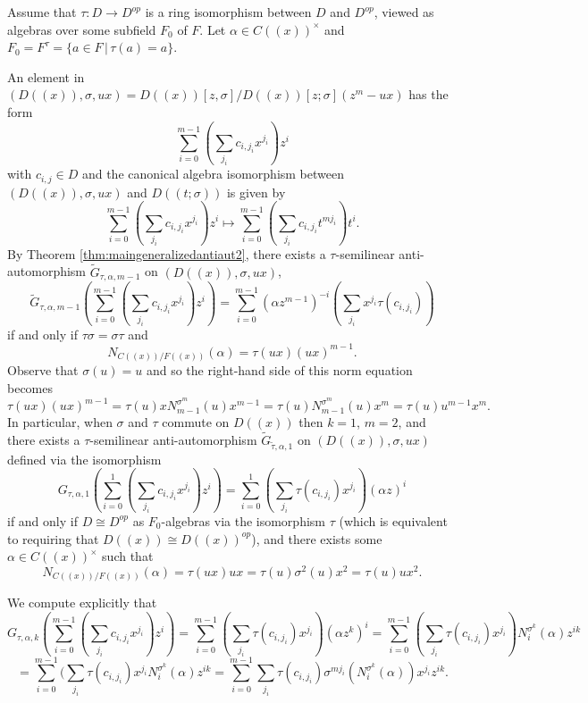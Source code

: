\documentclass{amsart}
\theoremstyle{plain}
\theoremstyle{definition}
\numberwithin{equation}{section}
\numberwithin{figure}{section}
\begin{document}
Assume that $\tau:D\to D^{op}$ is a ring isomorphism between $D$ and $D^{op}$, viewed as algebras over some subfield $F_0$ of $F$. Let  $\alpha\in C((x))^\times$ and $F_0=F^\tau=\{a\in F\,|\,\tau(a)=a \}$.

An element in $(D((x)),\sigma, ux)=D((x))[z,\sigma]/D((x))[z;\sigma](z^m-ux)$ has the form
 $$ \sum_{i=0}^{m-1}(\sum_{j_i}c_{i,j_i} x^{j_i}) z^i$$
 with $c_{i,j}\in D$ and the canonical algebra isomorphism between $(D((x)),\sigma, ux)$ and $D((t;\sigma))$ is given by
 $$ \sum_{i=0}^{m-1}(\sum_{j_i}c_{i,j_i} x^{j_i}) z^i\mapsto  \sum_{i=0}^{m-1}(\sum_{j_i}c_{i,j_i} t^{mj_i}) t^i.$$
By Theorem   \ref{thm:maingeneralizedantiaut2}, there exists a $\tau$-semilinear anti-automorphism $\widetilde G_{\tau,\alpha,m-1}$ on $ (D((x)),\sigma,ux)$,
 $$\widetilde G_{\tau,\alpha,m-1} ( \sum_{i=0}^{m-1}(\sum_{j_i}c_{i,{j_i}} x^{j_i}) z^i ) =
\sum_{i=0}^{m-1}  (\alpha z^{m-1})^{-i}(\sum_{j_i} x^{j_i} \tau(c_{i,{j_i}}))$$
  if and only if  $\tau\sigma=\sigma\tau$ and
 $$N_{C((x))/F((x))}(\alpha)=\tau(ux)(ux)^{m-1}.$$
 Observe that
 $\sigma(u) = u$ and so the right-hand side of this norm equation becomes
 $$\tau(ux)(ux)^{m-1}=\tau(u)x N_{m-1}^{\sigma^m}(u)x^{m-1}=\tau(u) N_{m-1}^{\sigma^m}(u) x^m=\tau(u) u^{m-1} x^m.$$
 In particular, when $\sigma$ and $\tau$ commute on $D((x))$ then $k=1$, $m=2$, and there exists a $\tau$-semilinear anti-automorphism $\widetilde G_{\tilde\tau,\alpha,1}$ on $(D((x)),\sigma, ux)$ defined via the isomorphism
$$G_{\tau,\alpha,1} ( \sum_{i=0}^{1}(\sum_{j_i}c_{i,{j_i}} x^{j_i}) z^i ) =
\sum_{i=0}^{1}(\sum_{j_i}\tau(c_{i,{j_i}}) x^{j_i}) (\alpha z)^i$$
 if and only if $D\cong D^{op} $ as $F_0$-algebras via the isomorphism $\tau$ (which is equivalent to requiring that $D((x))\cong D((x))^{op}$), and there exists  some $\alpha\in C((x))^\times$ such that
$$N_{C((x))/F((x))}(\alpha)=\tau(ux)ux=\tau(u)\sigma^2(u)x^2 =\tau(u)ux^2.$$

 We compute explicitly that
  $$
 G_{ \tau,\alpha,k} ( \sum_{i=0}^{m-1}(\sum_{j_i}c_{i,{j_i}} x^{j_i}) z^i ) =
\sum_{i=0}^{m-1}(\sum_{j_i}\tau(c_{i,{j_i}}) x^{j_i}) (\alpha z^k)^i =
\sum_{i=0}^{m-1}(\sum_{j_i}\tau(c_{i,{j_i}}) x^{j_i})  N_i^{\sigma^k}(\alpha) z^{ik}
$$
$$ = \sum_{i=0}^{m-1}(\sum_{j_i}\tau(c_{i,{j_i}}) x^{{j_i}}  N_i^{\sigma^k}(\alpha) z^{ik}
=  \sum_{i=0}^{m-1}\sum_{j_i}\tau(c_{i,{j_i}}) \sigma^{m{j_i}}( N_i^{\sigma^k}(\alpha)) x^{j_i}  z^{ik}.$$
\end{document}

